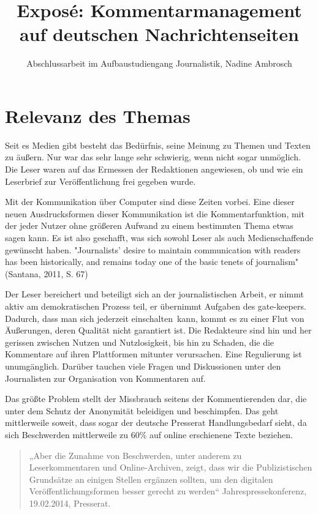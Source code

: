 \documentclass[12pt]{scrartcl} %
\title{Exposé: Kommentarmanagement auf deutschen Nachrichtenseiten}
\author{Abschlussarbeit im Aufbaustudiengang Journalistik, Nadine Ambrosch}
\begin{document}
\maketitle






\section{Relevanz des Themas}

Seit es Medien gibt besteht das Bedürfnis, seine Meinung zu Themen und Texten zu
äußern. Nur war das sehr lange sehr schwierig, wenn nicht sogar unmöglich. Die
Leser waren auf das Ermessen der Redaktionen angewiesen, ob und wie ein
Leserbrief zur Veröffentlichung frei gegeben wurde. 

Mit der Kommunikation über
Computer sind diese Zeiten vorbei. Eine dieser neuen Ausdrucksformen dieser
Kommunikation ist die Kommentarfunktion, mit der jeder Nutzer ohne größeren
Aufwand zu einem bestimmten Thema etwas sagen kann. Es ist also geschafft, was
sich sowohl Leser als auch Medienschaffende gewünscht haben. "Journalists’ desire to 
maintain communication with readers has
been historically, and remains today one of the basic tenets of journalism" (Santana, 2011, S. 67) 

Der Leser bereichert und beteiligt sich an der journalistischen Arbeit, er nimmt
aktiv am demokratischen Prozess teil, er übernimmt Aufgaben des gate-keepers.
Dadurch, dass man sich jederzeit \glqq einschalten\grqq\ kann, kommt es zu
einer Flut von Äußerungen, deren Qualität nicht garantiert ist. Die Redakteure
sind hin und her gerissen zwischen Nutzen und Nutzlosigkeit, bis hin zu Schaden,
die die Kommentare auf ihren Plattformen mitunter verursachen. Eine Regulierung
ist unumgänglich. Darüber tauchen viele Fragen und Diskussionen unter den
Journalisten zur Organisation von Kommentaren auf.

Das größte Problem stellt der Missbrauch seitens der Kommentierenden dar, die unter dem Schutz
der Anonymität beleidigen und beschimpfen. Das geht mittlerweile soweit, dass
sogar der deutsche Presserat Handlungsbedarf sieht, da sich Beschwerden
mittlerweile zu 60\% auf online erschienene Texte beziehen.  

\begin{quote}
„Aber die Zunahme
von Beschwerden, unter anderem zu Leserkommentaren und Online-Archiven, zeigt,
dass wir die Publizistischen Grundsätze an einigen Stellen ergänzen sollten, um
den digitalen Ver\-öffentlichungs\-for\-men besser gerecht zu werden“
Jahrespressekonferenz, 19.02.2014, Presserat. 
\end{quote}
\end{document}
